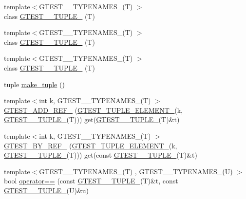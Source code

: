 \begin{DoxyCompactItemize}
\item 
{\footnotesize template$<$\-G\-T\-E\-S\-T\-\_\-\_\-\-T\-Y\-P\-E\-N\-A\-M\-E\-S\-\_\-(\-T) $>$ }\\class \hyperlink{namespacestd_1_1tr1_ad6a867e93619b1820bcdb560c55ecf21}{\-G\-T\-E\-S\-T\-\_\-\_\-\-T\-U\-P\-L\-E\-\_\-} (\-T)
\item 
{\footnotesize template$<$\-G\-T\-E\-S\-T\-\_\-\_\-\-T\-Y\-P\-E\-N\-A\-M\-E\-S\-\_\-(\-T) $>$ }\\class \hyperlink{namespacestd_1_1tr1_a029d6c54a9d8d6b455d4bdb7cdbb4a58}{\-G\-T\-E\-S\-T\-\_\-\_\-\-T\-U\-P\-L\-E\-\_\-} (\-T)
\item 
{\footnotesize template$<$\-G\-T\-E\-S\-T\-\_\-\_\-\-T\-Y\-P\-E\-N\-A\-M\-E\-S\-\_\-(\-T) $>$ }\\class \hyperlink{namespacestd_1_1tr1_af4a00d1accea9dabe605c9895f33a0a3}{\-G\-T\-E\-S\-T\-\_\-\_\-\-T\-U\-P\-L\-E\-\_\-} (\-T)
\item 
tuple \hyperlink{namespacestd_1_1tr1_a21692ee06c36147458c1f75e7c8a1296}{make\-\_\-tuple} ()
\item 
{\footnotesize template$<$int k, \-G\-T\-E\-S\-T\-\_\-\_\-\-T\-Y\-P\-E\-N\-A\-M\-E\-S\-\_\-(\-T) $>$ }\\\hyperlink{namespacestd_1_1tr1_aae60f16ee244270a28a0374fed590548}{\-G\-T\-E\-S\-T\-\_\-\-A\-D\-D\-\_\-\-R\-E\-F\-\_\-} (\hyperlink{gtest-tuple_8h_a1b7f133d8aa02e0b7afed7b66781eeb7}{\-G\-T\-E\-S\-T\-\_\-\-T\-U\-P\-L\-E\-\_\-\-E\-L\-E\-M\-E\-N\-T\-\_\-}(k, \hyperlink{gtest-tuple_8h_a275e7bcd84299cc44b9c1dba971951c4}{\-G\-T\-E\-S\-T\-\_\-\_\-\-T\-U\-P\-L\-E\-\_\-}(\-T))) get(\hyperlink{gtest-tuple_8h_a275e7bcd84299cc44b9c1dba971951c4}{\-G\-T\-E\-S\-T\-\_\-\_\-\-T\-U\-P\-L\-E\-\_\-}(\-T)\&t)
\item 
{\footnotesize template$<$int k, \-G\-T\-E\-S\-T\-\_\-\_\-\-T\-Y\-P\-E\-N\-A\-M\-E\-S\-\_\-(\-T) $>$ }\\\hyperlink{namespacestd_1_1tr1_a70eef1687deb32579a7162328afc3778}{\-G\-T\-E\-S\-T\-\_\-\-B\-Y\-\_\-\-R\-E\-F\-\_\-} (\hyperlink{gtest-tuple_8h_a1b7f133d8aa02e0b7afed7b66781eeb7}{\-G\-T\-E\-S\-T\-\_\-\-T\-U\-P\-L\-E\-\_\-\-E\-L\-E\-M\-E\-N\-T\-\_\-}(k, \hyperlink{gtest-tuple_8h_a275e7bcd84299cc44b9c1dba971951c4}{\-G\-T\-E\-S\-T\-\_\-\_\-\-T\-U\-P\-L\-E\-\_\-}(\-T))) get(const \hyperlink{gtest-tuple_8h_a275e7bcd84299cc44b9c1dba971951c4}{\-G\-T\-E\-S\-T\-\_\-\_\-\-T\-U\-P\-L\-E\-\_\-}(\-T)\&t)
\item 
{\footnotesize template$<$\-G\-T\-E\-S\-T\-\_\-\_\-\-T\-Y\-P\-E\-N\-A\-M\-E\-S\-\_\-(\-T) , \-G\-T\-E\-S\-T\-\_\-\_\-\-T\-Y\-P\-E\-N\-A\-M\-E\-S\-\_\-(\-U) $>$ }\\bool \hyperlink{namespacestd_1_1tr1_acd4cf6107e05913b8a70108a023952b9}{operator==} (const \hyperlink{gtest-tuple_8h_a275e7bcd84299cc44b9c1dba971951c4}{\-G\-T\-E\-S\-T\-\_\-\_\-\-T\-U\-P\-L\-E\-\_\-}(\-T)\&t, const \hyperlink{gtest-tuple_8h_a275e7bcd84299cc44b9c1dba971951c4}{\-G\-T\-E\-S\-T\-\_\-\_\-\-T\-U\-P\-L\-E\-\_\-}(\-U)\&u)

\end{DoxyCompactItemize}
